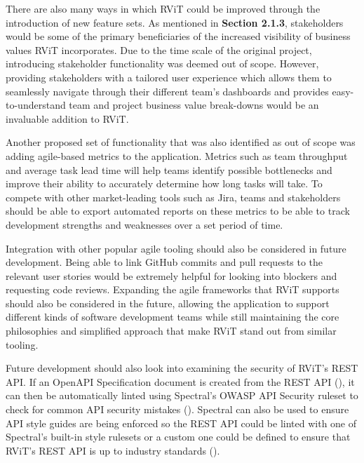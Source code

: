 \documentclass[l4proj.tex]{subfiles}
\begin{document}
There are also many ways in which RViT could be improved through the introduction of new feature sets. As mentioned in \textbf{Section 2.1.3}, stakeholders would be some of the primary beneficiaries of the increased visibility of business values RViT incorporates. Due to the time scale of the original project, introducing stakeholder functionality was deemed out of scope. However, providing stakeholders with a tailored user experience which allows them to seamlessly navigate through their different team's dashboards and provides easy-to-understand team and project business value break-downs would be an invaluable addition to RViT.

Another proposed set of functionality that was also identified as out of scope was adding agile-based metrics to the application. Metrics such as team throughput and average task lead time will help teams identify possible bottlenecks and improve their ability to accurately determine how long tasks will take. To compete with other market-leading tools such as Jira, teams and stakeholders should be able to export automated reports on these metrics to be able to track development strengths and weaknesses over a set period of time. 

Integration with other popular agile tooling should also be considered in future development. Being able to link GitHub commits and pull requests to the relevant user stories would be extremely helpful for looking into blockers and requesting code reviews. Expanding the agile frameworks that RViT supports should also be considered in the future, allowing the application to support different kinds of software development teams while still maintaining the core philosophies and simplified approach that make RViT stand out from similar tooling.  

Future development should also look into examining the security of RViT's REST API. If an OpenAPI Specification document is created from the REST API (\cite{OpenAPISpec}), it can then be automatically linted using Spectral's OWASP API Security ruleset to check for common API security mistakes (\cite{SpectralOWASP}). Spectral can also be used to ensure API style guides are being enforced so the REST API could be linted with one of Spectral's built-in style rulesets or a custom one could be defined to ensure that RViT's REST API is up to industry standards (\cite{SpectralLinting}).
\end{document}
